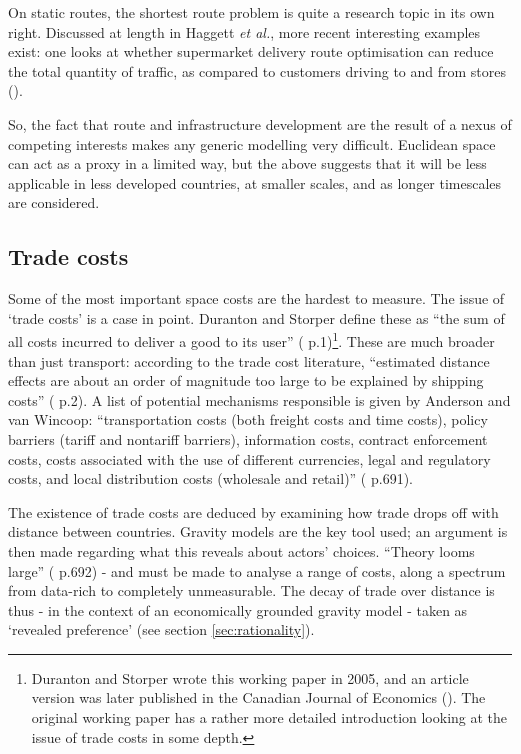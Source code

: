 {On static routes, the shortest route problem is quite a research topic in its own right. Discussed at length in Haggett \emph{et al.}, more recent interesting examples exist: one looks at whether supermarket delivery route optimisation can reduce the total quantity of traffic, as compared to customers driving to and from stores (\citealt{cairns_delivering_2005}). 

So, the fact that route and infrastructure development are the result of a nexus of competing interests makes any generic modelling very difficult. Euclidean space can act as a proxy in a limited way, but the above suggests that it will be less applicable in less developed countries, at smaller scales, and as longer timescales are considered. 

\subsection{Trade costs \label{sec:hiddencosts}}

Some of the most important space costs are the hardest to measure. The issue of `trade costs' is a case in point. Duranton and Storper define these as ``the sum of all costs incurred to deliver a good to its user'' (\citealt{ duranton_rising_2005} p.1)\footnote{Duranton and Storper wrote this working paper in 2005, and an article version was later published in the Canadian Journal of Economics (\citealt{duranton_rising_2008}). The original working paper has a rather more detailed introduction looking at the issue of trade costs in some depth.}. These are much broader than just transport: according to the trade cost literature, ``estimated distance effects are about an order of magnitude too large to be explained by shipping costs'' (\citealt{ disdier_puzzling_2008} p.2).  A list of potential mechanisms responsible is given by Anderson and van Wincoop: ``transportation costs (both freight costs and time costs), policy barriers (tariff and nontariff barriers), information costs, contract enforcement costs, costs associated with the use of different currencies, legal and regulatory costs, and local distribution costs (wholesale and retail)'' (\citealt{anderson_trade_2004} p.691).

The existence of trade costs are deduced by examining how trade drops off with distance between countries. Gravity models are the key tool used; an argument is then made regarding what this reveals about actors' choices. ``Theory looms large'' (\citealt{ anderson_trade_2004} p.692) - and must be made to analyse a range of costs, along a spectrum from data-rich to completely unmeasurable. The decay of trade over distance is thus - in the context of an economically grounded gravity model - taken as `revealed preference' (see section \ref{sec:rationality}). 

}
